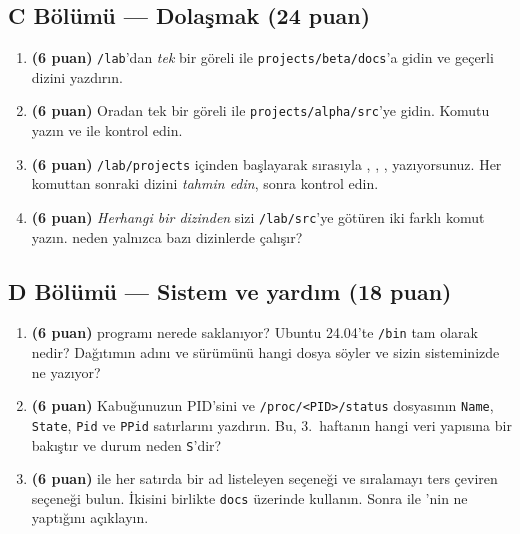 \subsection*{C Bölümü --- Dolaşmak (24 puan)}
\begin{enumerate}[label=\textbf{C\arabic*}, leftmargin=2.2em, start=9]
  \item \textbf{(6 puan)} \texttt{\tl/lab}'dan \emph{tek} bir göreli  ile \texttt{projects/beta/docs}'a gidin ve geçerli dizini yazdırın.
  \item \textbf{(6 puan)} Oradan tek bir göreli  ile \texttt{projects/alpha/src}'ye gidin. Komutu yazın ve  ile kontrol edin.
  \item \textbf{(6 puan)} \texttt{\tl/lab/projects} içinden başlayarak sırasıyla , , ,  yazıyorsunuz. Her komuttan sonraki dizini \emph{tahmin edin}, sonra kontrol edin.
  \item \textbf{(6 puan)} \emph{Herhangi bir dizinden} sizi \texttt{\tl/lab/src}'ye götüren iki farklı komut yazın.  neden yalnızca bazı dizinlerde çalışır?
\end{enumerate}

\subsection*{D Bölümü --- Sistem ve yardım (18 puan)}
\begin{enumerate}[label=\textbf{D\arabic*}, leftmargin=2.2em, start=13]
  \item \textbf{(6 puan)}  programı nerede saklanıyor? Ubuntu 24.04'te \texttt{/bin} tam olarak nedir? Dağıtımın adını ve sürümünü hangi dosya söyler ve sizin sisteminizde ne yazıyor?
  \item \textbf{(6 puan)} Kabuğunuzun PID'sini ve \texttt{/proc/<PID>/status} dosyasının \texttt{Name}, \texttt{State}, \texttt{Pid} ve \texttt{PPid} satırlarını yazdırın. Bu, 3.\ haftanın hangi veri yapısına bir bakıştır ve durum neden \texttt{S}'dir?
  \item \textbf{(6 puan)}  ile her satırda bir ad listeleyen seçeneği ve sıralamayı ters çeviren seçeneği bulun. İkisini birlikte \texttt{docs} üzerinde kullanın. Sonra  ile 'nin ne yaptığını açıklayın.
\end{enumerate}

